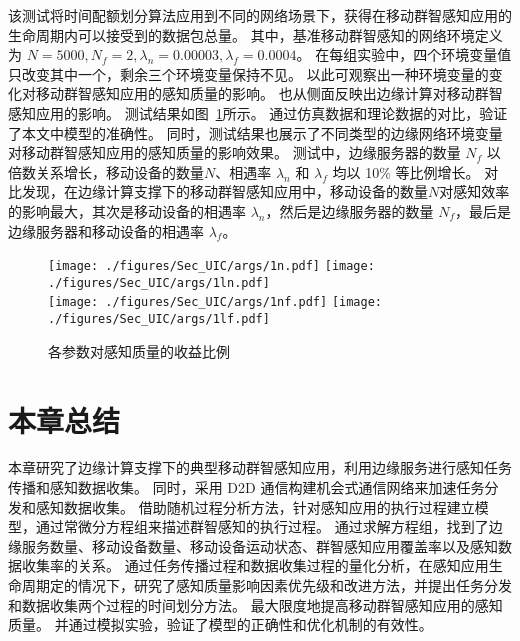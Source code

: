 该测试将时间配额划分算法应用到不同的网络场景下，获得在移动群智感知应用的生命周期内可以接受到的数据包总量。
其中，基准移动群智感知的网络环境定义为 $N=5000, N_f=2, \lambda_n = 0.00003, \lambda_f=0.0004$。
在每组实验中，四个环境变量值只改变其中一个，剩余三个环境变量保持不见。
以此可观察出一种环境变量的变化对移动群智感知应用的感知质量的影响。
也从侧面反映出边缘计算对移动群智感知应用的影响。
测试结果如图~\ref{Figure_SingleValTest}所示。
通过仿真数据和理论数据的对比，验证了本文中模型的准确性。
同时，测试结果也展示了不同类型的边缘网络环境变量对移动群智感知应用的感知质量的影响效果。
测试中，边缘服务器的数量 $N_f$ 以倍数关系增长，移动设备的数量$N$、相遇率 $\lambda_n$ 和 $\lambda_f$ 均以 10\% 等比例增长。
对比发现，在边缘计算支撑下的移动群智感知应用中，移动设备的数量$N$对感知效率的影响最大，其次是移动设备的相遇率 $\lambda_n$，然后是边缘服务器的数量 $N_f$，最后是边缘服务器和移动设备的相遇率 $\lambda_f$。

\begin{figure}[!h]
  \centering
	{\texttt{[image: ./figures/Sec\_UIC/args/1n.pdf]}}
	{\texttt{[image: ./figures/Sec\_UIC/args/1ln.pdf]}}\\
	{\texttt{[image: ./figures/Sec\_UIC/args/1nf.pdf]}}
	{\texttt{[image: ./figures/Sec\_UIC/args/1lf.pdf]}}
	\vspace{-1em}
	\caption{各参数对感知质量的收益比例}
	\label{Figure_SingleValTest}
\end{figure}

\section{本章总结}

本章研究了边缘计算支撑下的典型移动群智感知应用，利用边缘服务进行感知任务传播和感知数据收集。
同时，采用 D2D 通信构建机会式通信网络来加速任务分发和感知数据收集。
借助随机过程分析方法，针对感知应用的执行过程建立模型，通过常微分方程组来描述群智感知的执行过程。
通过求解方程组，找到了边缘服务数量、移动设备数量、移动设备运动状态、群智感知应用覆盖率以及感知数据收集率的关系。
通过任务传播过程和数据收集过程的量化分析，在感知应用生命周期定的情况下，研究了感知质量影响因素优先级和改进方法，并提出任务分发和数据收集两个过程的时间划分方法。
最大限度地提高移动群智感知应用的感知质量。
并通过模拟实验，验证了模型的正确性和优化机制的有效性。
